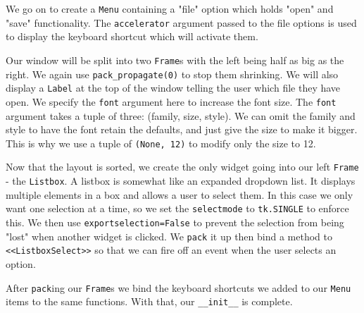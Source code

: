\documentclass[a4paper,11pt,openany]{book}
\begin{document}
\vspace{5mm} 

We go on to create a \lstinline[columns=fixed]{Menu} containing a "file" option which holds "open" and "save" functionality. The \lstinline[columns=fixed]{accelerator} argument passed to the file options is used to display the keyboard shortcut which will activate them. 

\vspace{5mm}

Our window will be split into two \lstinline[columns=fixed]{Frame}s with the left being half as big as the right. We again use \lstinline[columns=fixed]{pack_propagate(0)} to stop them shrinking. We will also display a \lstinline[columns=fixed]{Label} at the top of the window telling the user which file they have open. We specify the \lstinline[columns=fixed]{font} argument here to increase the font size. The \lstinline[columns=fixed]{font} argument takes a tuple of three: (family, size, style). We can omit the family and style to have the font retain the defaults, and just give the size to make it bigger. This is why we use a tuple of \lstinline[columns=fixed]{(None, 12)} to modify only the size to 12.

\vspace{5mm}

Now that the layout is sorted, we create the only widget going into our left \lstinline[columns=fixed]{Frame} - the \lstinline[columns=fixed]{Listbox}. A listbox is somewhat like an expanded dropdown list. It displays multiple elements in a box and allows a user to select them. In this case we only want one selection at a time, so we set the \lstinline[columns=fixed]{selectmode} to \lstinline[columns=fixed]{tk.SINGLE} to enforce this. We then use \lstinline[columns=fixed]{exportselection=False} to prevent the selection from being "lost" when another widget is clicked. We \lstinline[columns=fixed]{pack} it up then bind a method to \lstinline[columns=fixed]{<<ListboxSelect>>} so that we can fire off an event when the user selects an option. 

\vspace{5mm}

After \lstinline[columns=fixed]{pack}ing our \lstinline[columns=fixed]{Frame}s we bind the keyboard shortcuts we added to our \lstinline[columns=fixed]{Menu} items to the same functions. With that, our \lstinline[columns=fixed]{__init__} is complete.
\end{document}
